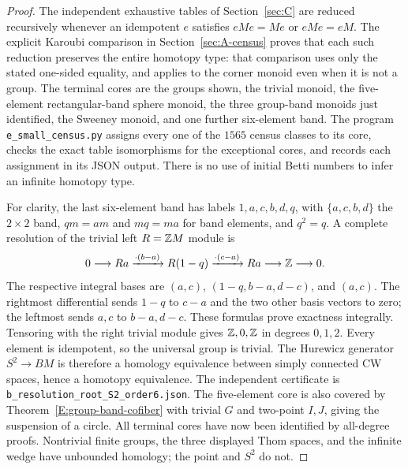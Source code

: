 \begin{proof}
The independent exhaustive tables of Section~\ref{sec:C} are reduced
recursively whenever an idempotent $e$ satisfies $eMe=Me$ or $eMe=eM$.
The explicit Karoubi comparison in Section~\ref{sec:A-census} proves
that each such reduction preserves the entire homotopy type: that
comparison uses only the stated one-sided equality, and applies to
the corner monoid even when it is not a group. The
terminal cores are the groups shown, the trivial monoid, the five-element
rectangular-band sphere monoid, the three group-band monoids just
identified, the Sweeney monoid, and one further six-element band.
The program \texttt{e\_small\_census.py} assigns every one of the $1565$
census classes to its core, checks the exact table isomorphisms for the
exceptional cores, and records each assignment in its JSON output.
There is no use of initial Betti numbers to infer an infinite homotopy type.

For clarity, the last six-element band has labels $1,a,c,b,d,q$, with
$\{a,c,b,d\}$ the $2\times2$ band, $qm=am$ and $mq=ma$ for band elements,
and $q^2=q$. A complete resolution of the trivial left $R=\mathbb Z M$ module is
\[
 0\longrightarrow Ra\xrightarrow{\cdot(b-a)}R(1-q)
 \xrightarrow{\cdot(c-a)}Ra\longrightarrow\mathbb Z\longrightarrow0.
\]
The respective integral bases are $(a,c)$,
$(1-q,b-a,d-c)$, and $(a,c)$. The rightmost differential sends $1-q$
to $c-a$ and the two other basis vectors to zero; the leftmost sends
$a,c$ to $b-a,d-c$. These formulas prove exactness integrally.
Tensoring with the right trivial module gives $\mathbb Z,0,\mathbb Z$ in degrees
$0,1,2$. Every element is idempotent, so the universal group is trivial.
The Hurewicz generator $S^2\to BM$ is therefore a homology equivalence
between simply connected CW spaces, hence a homotopy equivalence.
The independent certificate is
\texttt{b\_resolution\_root\_S2\_order6.json}.
The five-element core is also covered by Theorem~\ref{E:group-band-cofiber}
with trivial $G$ and two-point $I,J$, giving the suspension of a circle.
All terminal cores have now been identified by all-degree proofs.
Nontrivial finite groups, the three displayed Thom spaces, and the
infinite wedge have unbounded homology; the point and $S^2$ do not.
\end{proof}

